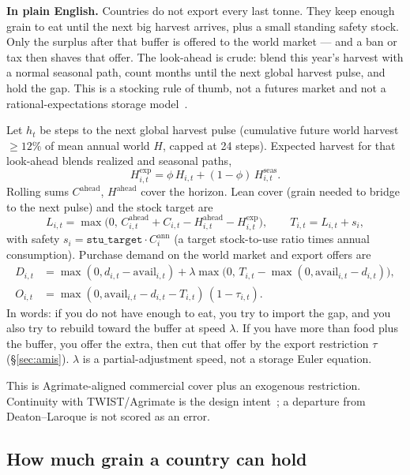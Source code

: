 \textbf{In plain English.} Countries do not export every last tonne. They
keep enough grain to eat until the next big harvest arrives, plus a small
standing safety stock. Only the surplus after that buffer is offered to the
world market --- and a ban or tax then shaves that offer. The look-ahead is
crude: blend this year's harvest with a normal seasonal path, count months
until the next global harvest pulse, and hold the gap. This is a stocking
rule of thumb, not a futures market and not a rational-expectations storage
model~\citep{deaton1992}.

Let $h_t$ be steps to the next global harvest pulse (cumulative future world
harvest $\ge 12\%$ of mean annual world $H$, capped at 24 steps). Expected
harvest for that look-ahead blends realized and seasonal paths,
\begin{equation}
H^{\mathrm{exp}}_{i,t}=\phi\,H_{i,t}+(1-\phi)\,H^{\mathrm{seas}}_{i,t}.
\end{equation}
Rolling sums $C^{\mathrm{ahead}}$, $H^{\mathrm{ahead}}$ cover the horizon.
Lean cover (grain needed to bridge to the next pulse) and the stock target
are
\begin{equation}
\label{eq:lean}
L_{i,t}=\max\bigl(0,\,C^{\mathrm{ahead}}_{i,t}+C_{i,t}-H^{\mathrm{ahead}}_{i,t}-H^{\mathrm{exp}}_{i,t}\bigr),
\qquad
T_{i,t}=L_{i,t}+s_i,
\end{equation}
with safety $s_i=\mathtt{stu\_target}\cdot C_i^{\mathrm{ann}}$ (a target
stock-to-use ratio times annual consumption). Purchase demand on the world
market and export offers are
\begin{align}
\label{eq:demand-offers}
D_{i,t}&=\max(0,d_{i,t}-\mathrm{avail}_{i,t})
+\lambda\max\bigl(0,\,T_{i,t}-\max(0,\mathrm{avail}_{i,t}-d_{i,t})\bigr),\\
O_{i,t}&=\max(0,\mathrm{avail}_{i,t}-d_{i,t}-T_{i,t})\,(1-\tau_{i,t}).
\end{align}
In words: if you do not have enough to eat, you try to import the gap, and
you also try to rebuild toward the buffer at speed $\lambda$. If you have
more than food plus the buffer, you offer the extra, then cut that offer by
the export restriction $\tau$ (\S\ref{sec:amis}). $\lambda$ is a
partial-adjustment speed, not a storage Euler equation.

This is Agrimate-aligned commercial cover plus an exogenous restriction.
Continuity with TWIST/Agrimate is the design intent~\citep{schewe2017,kuhla2025};
a departure from Deaton--Laroque is not scored as an error.

\subsection{How much grain a country can hold}
\label{sec:warehouse}

